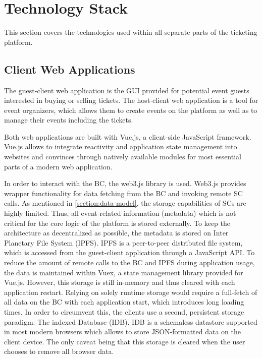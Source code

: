 \section{Technology Stack}\label{chapter:technology}

This section covers the technologies used within all separate parts of the ticketing platform.

\subsection{Client Web Applications}

The guest-client web application is the GUI provided for potential event guests interested in buying or selling tickets. The host-client web application is a tool for event organizers, which allows them to create events on the platform as well as to manage their events including the tickets.

Both web applications are built with Vue.js, a client-side JavaScript framework. Vue.js allows to integrate reactivity and application state management into websites and convinces through natively available modules for most essential parts of a modern web application.

In order to interact with the BC, the web3.js library is used. Web3.js provides wrapper functionality for data fetching from the BC and invoking remote SC calls. 
As mentioned in \ref{section:data-model}, the storage capabilities of SCs are highly limited. Thus, all event-related information (metadata) which is not critical for the core logic of the platform is stored externally. To keep the architecture as decentralized as possible, the metadata is stored on Inter Planetary File System (IPFS). IPFS is a peer-to-peer distributed file system, which is accessed from the guest-client application through a JavaScript API. To reduce the amount of remote calls to the BC and IPFS during application usage, the data is maintained within Vuex, a state management library provided for Vue.js. However, this storage is still in-memory and thus cleared with each application restart. Relying on solely runtime storage would require a full-fetch of all data on the BC with each application start, which introduces long loading times. In order to circumvent this, the clients use a second, persistent storage paradigm: The indexed Database (IDB). IDB is a schemaless datastore supported in most modern browsers which allows to store JSON-formatted data on the client device. The only caveat being that this storage is cleared when the user chooses to remove all browser data.


